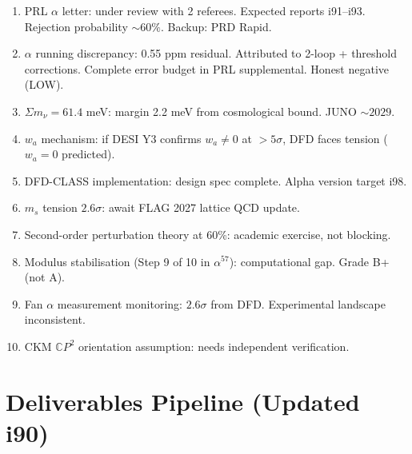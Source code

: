 \documentclass[11pt,a4paper]{article}
\begin{document}
\begin{enumerate}
\item PRL $\alpha$ letter: under review with 2 referees. Expected reports i91--i93. Rejection probability $\sim 60\%$. Backup: PRD Rapid.
\item $\alpha$ running discrepancy: 0.55 ppm residual. Attributed to 2-loop + threshold corrections. Complete error budget in PRL supplemental. Honest negative (LOW).
\item $\Sigma m_\nu = 61.4$ meV: margin 2.2 meV from cosmological bound. JUNO $\sim 2029$.
\item $w_a$ mechanism: if DESI Y3 confirms $w_a \neq 0$ at $> 5\sigma$, DFD faces tension ($w_a = 0$ predicted).
\item DFD-CLASS implementation: design spec complete. Alpha version target i98.
\item $m_s$ tension $2.6\sigma$: await FLAG 2027 lattice QCD update.
\item Second-order perturbation theory at 60\%: academic exercise, not blocking.
\item Modulus stabilisation (Step 9 of 10 in $\alpha^{57}$): computational gap. Grade B+ (not A).
\item Fan $\alpha$ measurement monitoring: $2.6\sigma$ from DFD. Experimental landscape inconsistent.
\item CKM $\mathbb{C}P^2$ orientation assumption: needs independent verification.
\end{enumerate}

\section{Deliverables Pipeline (Updated i90)}
\end{document}
